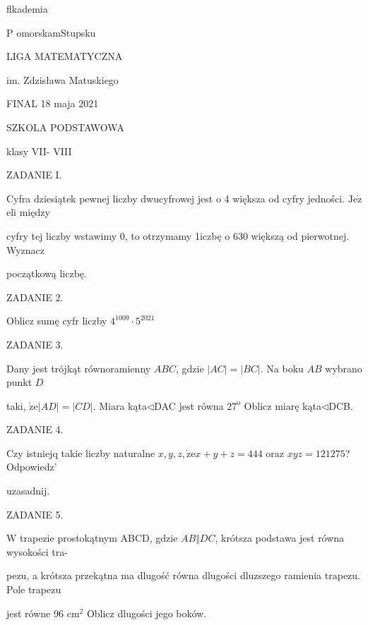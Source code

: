 \documentclass[a4paper,12pt]{article}
\begin{document}
flkademia

P omorskamStupsku

LIGA MATEMATYCZNA

im. Zdzisława Matuskiego

FINAL 18 maja 2021

SZKOLA PODSTAWOWA

klasy VII- VIII

ZADANIE I.

Cyfra dziesiątek pewnej liczby dwucyfrowej jest o 4 większa od cyfry jedności. $\mathrm{J}\mathrm{e}\dot{\mathrm{z}}$ eli między

cyfry tej liczby wstawimy 0, to otrzymamy 1iczbę o 630 większą od pierwotnej. Wyznacz

początkową liczbę.

ZADANIE 2.

Oblicz sumę cyfr liczby $4^{1009}\cdot 5^{2021}$

ZADANIE 3.

Dany jest trójkąt równoramienny $ABC$, gdzie $|AC| = |BC|$. Na boku $AB$ wybrano punkt $D$

taki, $\dot{\mathrm{z}}\mathrm{e}|AD|=|CD|$. Miara kąta$\triangleleft$DAC jest równa $27^{\mathrm{o}}$ Oblicz miarę kąta$\triangleleft$DCB.

ZADANIE 4.

Czy istniejq takie liczby naturalne $x, y, z, \dot{\mathrm{z}}\mathrm{e}x+y+z=444$ oraz $xyz=121275$? Odpowiedz'

uzasadnij.

ZADANIE 5.

$\mathrm{W}$ trapezie prostokątnym ABCD, gdzie $AB\Vert DC$, krótsza podstawa jest równa wysokości tra-

pezu, a krótsza przekątna ma dlugość równa dlugości dluzszego ramienia trapezu. Pole trapezu

jest równe 96 $\mathrm{c}\mathrm{m}^{2}$ Oblicz dlugości jego boków.
\end{document}
